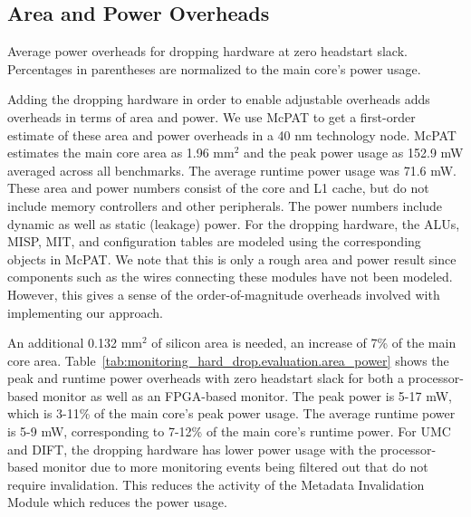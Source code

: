\subsection{Area and Power Overheads}

\begin{table}[tb]
  \begin{center}
    \caption{Average power overheads for dropping hardware at zero headstart
    slack. Percentages in parentheses are normalized to the main core's power usage.}
    \begin{footnotesize}
    
    \end{footnotesize}
    \label{tab:monitoring_hard_drop.evaluation.area_power}
  \end{center}
\end{table}

Adding the dropping hardware in order to enable adjustable overheads adds
overheads in terms of area and power. We use McPAT \cite{mcpat-micro09} to get
a first-order estimate of these area and power overheads in a 40 nm technology
node. McPAT estimates the main core area as 1.96 mm$^2$ and the peak power
usage as 152.9 mW averaged across all benchmarks. The average runtime power
usage was 71.6 mW. These area and power numbers consist of the core and L1
cache, but do not include memory controllers and other peripherals. The power
numbers include dynamic as well as static (leakage) power. For the dropping
hardware, the ALUs, MISP, MIT, and configuration tables are modeled using the
corresponding objects in McPAT. We note that this is only a rough area and
power result since components such as the wires connecting these modules have
not been modeled. However, this gives a sense of the order-of-magnitude
overheads involved with implementing our approach.

An additional 0.132 mm$^2$ of silicon area is needed, an increase of 7\% of the
main core area. Table~\ref{tab:monitoring_hard_drop.evaluation.area_power}
shows the peak and runtime power overheads with zero headstart slack for both a
processor-based monitor as well as an FPGA-based monitor. The peak power is
5-17 mW, which is 3-11\% of the main core's peak power usage. The average
runtime power is 5-9 mW, corresponding to 7-12\% of the main core's runtime
power. For UMC and DIFT, the dropping hardware has lower power usage with the
processor-based monitor due to
more monitoring events being filtered out that do not require invalidation.
This reduces the activity of the Metadata Invalidation Module which reduces the
power usage.

